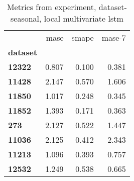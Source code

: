 \begin{table}[h]
\centering
\caption{Metrics from experiment, dataset-seasonal, local multivariate lstm}
\label{table:local-multivariate-lstm-dataset-seasonal}
\begin{tabular}{lrrr}
\toprule
{} &   mase &  smape &  mase-7 \\
\textbf{dataset} &        &        &         \\
\midrule
\textbf{12322  } &  0.807 &  0.100 &   0.381 \\
\textbf{11428  } &  2.147 &  0.570 &   1.606 \\
\textbf{11850  } &  1.017 &  0.248 &   0.345 \\
\textbf{11852  } &  1.393 &  0.171 &   0.363 \\
\textbf{273    } &  2.127 &  0.522 &   1.447 \\
\textbf{11036  } &  2.125 &  0.412 &   2.343 \\
\textbf{11213  } &  1.096 &  0.393 &   0.757 \\
\textbf{12532  } &  1.249 &  0.538 &   0.665 \\
\bottomrule
\end{tabular}
\end{table}
